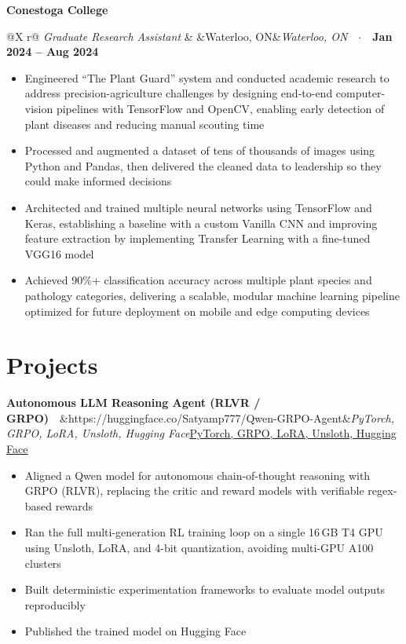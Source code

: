 \documentclass[letterpaper,10pt]{article}
\makeatletter
\newcommand{\org}[1]{\vspace{2pt}\textbf{#1}\par\vspace{-1pt}}
\newcommand{\role}[3]{%
  \begin{tabularx}{\textwidth}{@{}X r@{}}
    \textit{#1} & \ifx&#2&\else\textit{#2}\ \ $\cdot$\ \ \fi\textbf{#3}\\
  \end{tabularx}\vspace{-3pt}}
\newcommand{\project}[3]{%
  \Needspace{4\baselineskip}\vspace{2pt}\textbf{#1}\ \ \ifx&#3&\textit{#2}\else\href{#3}{\underline{#2}}\fi\par\vspace{-1pt}}
\makeatother
\begin{document}
\org{Conestoga College}
\role{Graduate Research Assistant}{Waterloo, ON}{Jan 2024 -- Aug 2024}
\begin{itemize}
  \item Engineered ``The Plant Guard'' system and conducted academic research to address precision-agriculture challenges
        by designing end-to-end computer-vision pipelines with TensorFlow and OpenCV, enabling early detection of plant
        diseases and reducing manual scouting time
  \item Processed and augmented a dataset of tens of thousands of images using Python and Pandas, then delivered the
        cleaned data to leadership so they could make informed decisions
  \item Architected and trained multiple neural networks using TensorFlow and Keras, establishing a baseline with a custom
        Vanilla CNN and improving feature extraction by implementing Transfer Learning with a fine-tuned VGG16 model
  \item Achieved 90\%+ classification accuracy across multiple plant species and pathology categories, delivering a
        scalable, modular machine learning pipeline optimized for future deployment on mobile and edge computing devices
\end{itemize}

\section{Projects}

\project{Autonomous LLM Reasoning Agent (RLVR / GRPO)}{PyTorch, GRPO, LoRA, Unsloth, Hugging Face}{https://huggingface.co/Satyamp777/Qwen-GRPO-Agent}
\begin{itemize}
  \item Aligned a Qwen model for autonomous chain-of-thought reasoning with GRPO (RLVR), replacing the critic and reward
        models with verifiable regex-based rewards
  \item Ran the full multi-generation RL training loop on a single 16\,GB T4 GPU using Unsloth, LoRA, and 4-bit
        quantization, avoiding multi-GPU A100 clusters
  \item Built deterministic experimentation frameworks to evaluate model outputs reproducibly
  \item Published the trained model on Hugging Face
\end{itemize}
\end{document}
